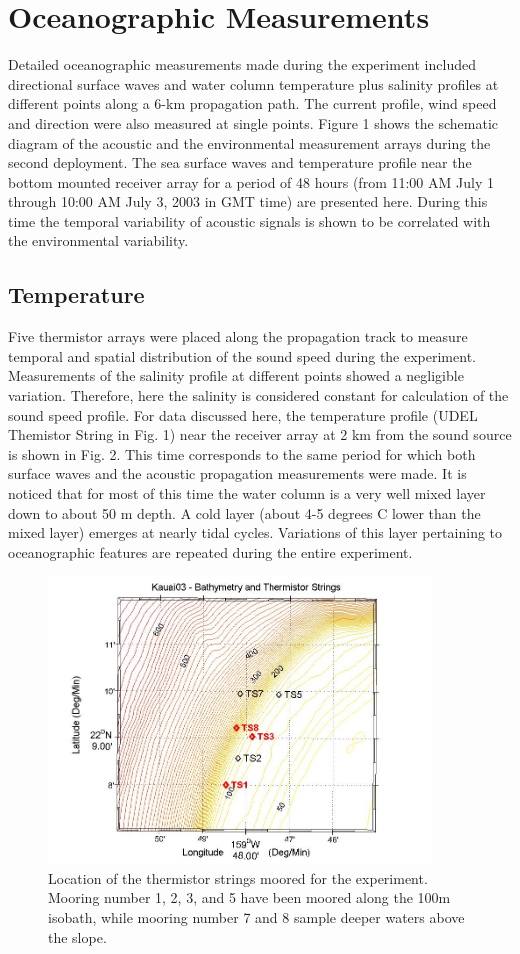 \section{Oceanographic Measurements}
Detailed oceanographic measurements made during the experiment
included directional surface waves and water column temperature plus
salinity profiles at different points along a 6-km propagation path.
The current profile, wind speed and direction were also measured at
single points. Figure 1 shows the schematic diagram of the acoustic
and the environmental measurement arrays during the second
deployment. The sea surface waves and temperature profile near the
bottom mounted receiver array for a period of 48 hours (from 11:00
AM July 1 through 10:00 AM July 3, 2003 in GMT time) are presented
here. During this time the temporal variability of acoustic signals
is shown to be correlated with the environmental variability.

\subsection{Temperature}
Five thermistor arrays were placed along the propagation track to
measure temporal and spatial distribution of the sound speed during
the experiment. Measurements of the salinity profile at different
points showed a negligible variation. Therefore, here the salinity
is considered constant for calculation of the sound speed profile.
For data discussed here, the temperature profile (UDEL Themistor
String in Fig. 1) near the receiver array at 2 km from the sound
source is shown in Fig. 2. This time corresponds to the same period
for which both surface waves and the acoustic propagation
measurements were made. It is noticed that for most of this time the
water column is a very well mixed layer down to about 50 m depth. A
cold layer (about 4-5 degrees C lower than the mixed layer) emerges
at nearly tidal cycles. Variations of this layer pertaining to
oceanographic features are repeated during the entire experiment.
\begin{figure}[htb]
\includegraphics[width=4in]{thermistorsPositions.jpg}
\caption{\normalsize  Location of the thermistor strings moored for
the experiment. Mooring number 1, 2, 3, and 5 have been moored along
the 100m isobath, while mooring number 7 and 8 sample deeper waters
above the slope. }\label{fig-thermistors}
\end{figure}

